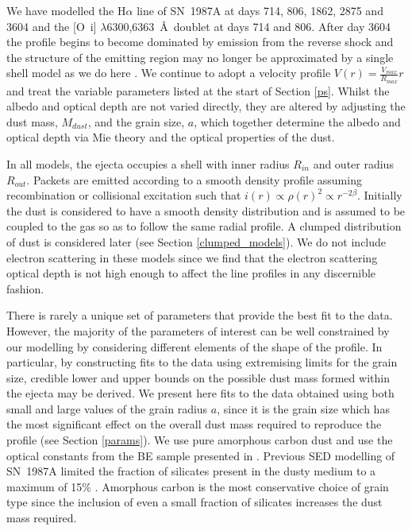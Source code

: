 \documentclass[useAMS,usenatbib,usegraphicx]{mnras}
\begin{document}
We have  modelled the H$\alpha$ line of SN~1987A at days 714, 806, 1862, 2875 and 3604 and the 
[O~{\sc i}] $\lambda$6300,6363~\AA\ doublet at days 714 and 806. After day 3604 the profile begins to become dominated by emission from the reverse shock 
and the structure of the emitting region may no longer be approximated by 
a single shell model as we do here \citep{Fransson2013}.  We continue to adopt a velocity profile $V(r) = 
\frac{V_{max}}{R_{max}}r$ and treat the variable parameters listed at the start of 
Section \ref{ps}.  Whilst the albedo and optical depth are not varied 
directly, they are altered by adjusting the dust mass, $M_{dust}$, and the 
grain size, $a$, which together determine the albedo and optical 
depth via  Mie theory and the optical properties of the 
dust.

In all models, the ejecta occupies a shell with inner radius $R_{in}$ and 
outer radius $R_{out}$.  Packets are emitted according to a smooth density 
profile assuming recombination or collisional excitation such that $i(r) \propto \rho(r)^2 \propto 
r^{-2\beta}$.  Initially the dust is considered to have a smooth density 
distribution and is assumed to be coupled to the gas so as to follow the same 
radial profile.  A clumped distribution of dust is considered later (see 
Section \ref{clumped_models}).  We do not include electron scattering in 
these models since we find that the electron scattering optical depth is not high enough to affect the line 
profiles in any discernible fashion.




There is rarely a unique set of parameters that provide the best fit to the data.  However, the 
majority of the parameters of interest can be well constrained by our 
modelling by considering different elements of the shape of the profile.  In particular, by constructing fits to 
the data using extremising limits for the grain 
size, credible lower and upper bounds on the possible dust mass formed 
within the ejecta may be derived.  We present here
 fits to the data obtained using both small and large values of the grain radius $a$, since 
it is the grain size which has the most significant effect on the overall 
dust mass required to reproduce the profile (see Section \ref{params}).  
We use pure amorphous carbon dust and use the optical 
constants from the BE sample presented in \citet{Zubko1996}.  Previous SED
modelling of SN~1987A limited the fraction of silicates present in the dusty 
medium to a maximum of 15\% \citep{Ercolano2007,Wesson2015}. Amorphous 
carbon is the most conservative choice of grain type since the inclusion of even a small 
fraction of silicates increases the dust mass required.
\end{document}
